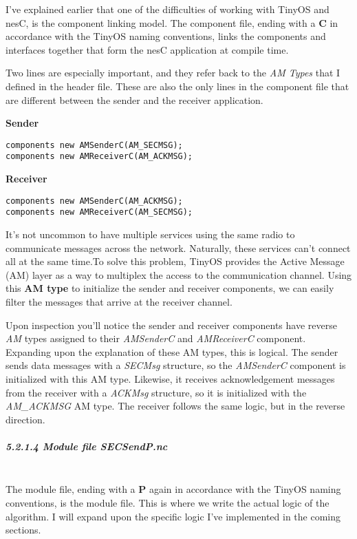 I've explained earlier that one of the difficulties of working with
TinyOS and nesC, is the component linking model. The component file,
ending with a \textbf{C} in accordance with the TinyOS naming
conventions, links the components and interfaces together that form the
nesC application at compile time.

Two lines are especially important, and they refer back to the \emph{AM
Types} that I defined in the header file. These are also the only lines
in the component file that are different between the sender and the
receiver application.

\textbf{Sender}

\begin{verbatim}
components new AMSenderC(AM_SECMSG);
components new AMReceiverC(AM_ACKMSG);
\end{verbatim}

\textbf{Receiver}

\begin{verbatim}
components new AMSenderC(AM_ACKMSG);
components new AMReceiverC(AM_SECMSG);
\end{verbatim}

It's not uncommon to have multiple services using the same radio to
communicate messages across the network. Naturally, these services can't
connect all at the same time.To solve this problem, TinyOS provides the
Active Message (AM) layer as a way to multiplex the access to the
communication channel. Using this \textbf{AM type} to initialize the
sender and receiver components, we can easily filter the messages that
arrive at the receiver channel.

Upon inspection you'll notice the sender and receiver components have
reverse \emph{AM} types assigned to their \emph{AMSenderC} and
\emph{AMReceiverC} component. Expanding upon the explanation of these AM
types, this is logical. The sender sends data messages with a
\emph{SECMsg} structure, so the \emph{AMSenderC} component is
initialized with this AM type. Likewise, it receives acknowledgement
messages from the receiver with a \emph{ACKMsg} structure, so it is
initialized with the \emph{AM\_ACKMSG} AM type. The receiver follows the
same logic, but in the reverse direction.

\subparagraph{5.2.1.4 Module file
\emph{SECSendP.nc}\\\\}\label{module-file-secsendp.nc}

The module file, ending with a \textbf{P} again in accordance with the
TinyOS naming conventions, is the module file. This is where we write
the actual logic of the algorithm. I will expand upon the specific logic
I've implemented in the coming sections.

